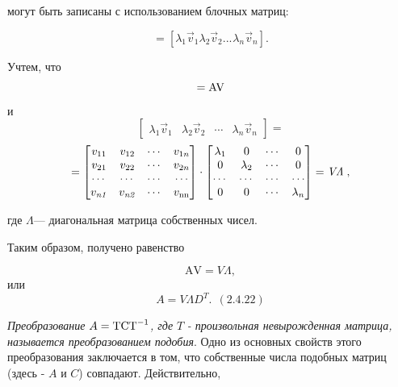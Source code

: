 		могут быть записаны с использованием блочных матриц:



\begin{equation*}
		[A\vec v_1^{}A\vec v_2^{}...^{}A\vec v_n]=[\lambda _1\vec v_1^{}\lambda _2\vec v_2^{}...^{}\lambda _n\vec v_n].
\end{equation*}



		Учтем, что
\begin{equation*}
[A\vec v_1^{}A\vec v_2^{}...^{}A\vec v_n]=\normalsubformula{\text{AV}}
\end{equation*}
		и
\begin{equation*}
\left[\begin{matrix}\lambda _1\vec v_1&\lambda _2\vec v_2&\cdots &\lambda _n\vec v_n\end{matrix}\right]=
\end{equation*}
\begin{equation*}
=\left[\begin{matrix}v_{11}&v_{12}&\cdots &v_{1n}\\v_{21}&v_{22}&\cdots &v_{2n}\\\cdots &\cdots &\cdots &\cdots
\\v_{\mathit{n1}}&v_{\mathit{n2}}&\cdots &v_{\normalsubformula{\text{nn}}}\end{matrix}\right]\cdot
\left[\begin{matrix}\lambda _1&0&\cdots &0\\0&\lambda _2&\cdots &0\\\cdots &\cdots &\cdots &\cdots \\0&0&\cdots
&\lambda _n\end{matrix}\right]=\mathit{V\Lambda }\;,
\end{equation*}

		где  $\Lambda $--- диагональная матрица собственных чисел.



		Таким образом, получено равенство



	\begin{equation*}
		 \text{AV}=\mathit{V\Lambda },
	\end{equation*}
	или
\begin{equation}\label{key}
	A=\mathit{V\Lambda D}^T.\ \ (2.4.22)
\end{equation}



		\textit{Преобразование } $A=\normalsubformula{\text{TCT}}^{-1}$\textit{, где } $T$\textit{ - произвольная невырожденная
			матрица, называется преобразованием подобия}. Одно из основных свойств этого преобразования заключается в том, что
		собственные числа подобных матриц (здесь -  $A$ и  $C$) совпадают. Действительно,



